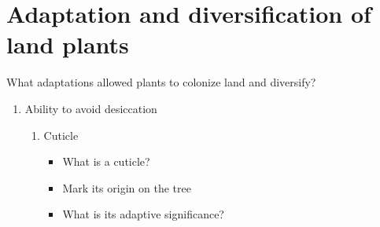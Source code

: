 \section[What adaptations allowed plants to colonize land and
    diversify?]{Adaptation and diversification of land plants}

\begin{noheadline}
\begin{frame}[t]
    \begin{adjustwidth}{-2em}{-1.5em}
        What adaptations allowed plants to colonize land and diversify?

        \begin{enumerate}
            \item Ability to avoid desiccation
            
            \begin{enumerate}
                \item Cuticle

                \begin{itemize}
                    \item What is a cuticle?


                        \vspace{8mm}
                    \item Mark its origin on the tree


                        \vspace{8mm}
                    \item What is its adaptive significance?

                \end{itemize}
            \end{enumerate}
        \end{enumerate}
    \end{adjustwidth}
\end{frame}
\end{noheadline}

